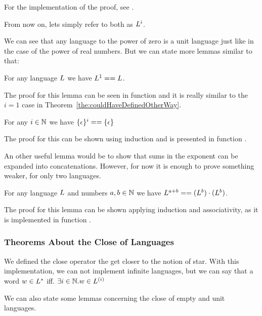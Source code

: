 For the implementation of the proof, see .

From now on, lets simply refer to both as $L^i$.

We can see that any language to the power of zero is a unit language just like in the case of the power of real numbers. But we can state more lemmas similar to that:

\begin{lemma}
	\label{lem:langToFirst}
	For any language $L$ we have $L^1 == L$.
\end{lemma}

The proof for this lemma can be seen in function  and it is really similar to the $i=1$ case in Theorem~\ref{the:couldHaveDefinedOtherWay}.

\begin{lemma}
	\label{lem:unitLangPow}
	For any $i \in \mathbb{N}$ we have $\{\epsilon\}^i == \{\epsilon\}$
\end{lemma}

The proof for this can be shown using induction and is presented in function .

An other useful lemma would be to show that sums in the exponent can be expanded into concatenations. However, for now it is enough to prove something weaker, for only two languages.

\begin{lemma}
	\label{lem:powSum}
	For any language $L$ and numbers $a,b \in \mathbb{N}$ we have $L ^ {a+b} == (L ^ b) \cdot (L ^ b)$.
\end{lemma}

The proof for this lemma can be shown applying induction and associativity, as it is implemented in function .

\subsubsection{Theorems About the Close of Languages}

We defined the close operator the get closer to the notion of star. With this implementation, we can not implement infinite languages, but we can say that a word $w \in L^{*}$ iff. $\exists i \in \mathbb{N}. w \in L^{(i)}$ 

We can also state some lemmas concerning the close of empty and unit languages.

